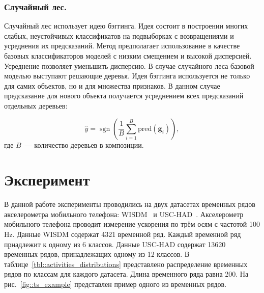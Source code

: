 \documentclass{llncs}
\DeclareMathOperator{\sgn}{\mathop{sgn}}
\begin{document}
\subsubsection{Случайный лес.}
Случайный лес использует идею бэггинга. 
Идея состоит в построении многих слабых, неустойчивых классификатов на подвыборках с возвращениями и усреднения их предсказаний.
Метод предполагает использование в качестве базовых классификаторов моделей с низким смещением и высокой дисперсией. 
Усреднение позволяет уменьшить дисперсию.
В случае случайного леса базовой моделью выступают решающие деревья. Идея бэггинга используется не только для самих объектов, но и для множества признаков.
В данном случае предсказание для нового объекта получается усреднением всех предсказаний отдельных деревьев:

\begin{equation*}
\hat{y} = \sgn \left(\frac{1}{B} \sum_{i=1}^{B} \text{pred}(\bm{g}_i) \right),
\end{equation*}
где $B$~--- количество деревьев в композиции.

\section{Эксперимент}
В данной работе эксперименты проводились на двух датасетах временных рядов акселерометра мобильного телефона: WISDM~\cite{wisdm} и USC-HAD~\cite{usc}. 
Акселерометр мобильного телефона проводит измерение ускорения по трём осям с частотой 100 Hz.
Данные WISDM содержат 4321 временной ряд.
Каждый временной ряд прнадлежит к одному из 6 классов. 
Данные USC-HAD содержат 13620 временных рядов, принадлежащих одному из 12 классов.  
В таблице~\ref{tbl::activities_distributions} представлено распределение временных рядов по классам для каждого датасета.
Длина временного ряда равна 200.
На рис.~\ref{fig::ts_example} представлен пример одного из временных рядов.
\end{document}
